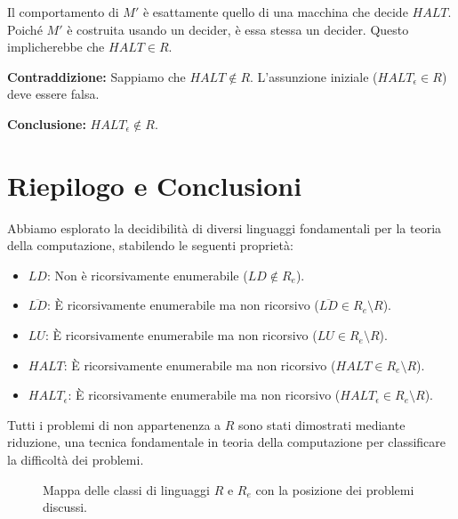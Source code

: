 \documentclass[a4paper]{article}
\makeatletter
\renewenvironment{proof}[1][\proofname]{\par
  \pushQED{\qed}%
  \normalfont \topsep6\p@\@plus6\p@\relax
  \trivlist
  \item[\hskip\labelsep
        \bfseries
    #1\@addpunct{.}]\ignorespaces
}{%
  \popQED\endtrivlist\@endpefalse
}
\makeatother
\begin{document}
\begin{proof}
Il comportamento di $M'$ è esattamente quello di una macchina che decide $HALT$. Poiché $M'$ è costruita usando un decider, è essa stessa un decider. Questo implicherebbe che $HALT \in R$.

\textbf{Contraddizione:} Sappiamo che $HALT \notin R$.
L'assunzione iniziale ($HALT_\epsilon \in R$) deve essere falsa.

\textbf{Conclusione:} $HALT_\epsilon \notin R$.
\end{proof}

\section{Riepilogo e Conclusioni}
Abbiamo esplorato la decidibilità di diversi linguaggi fondamentali per la teoria della computazione, stabilendo le seguenti proprietà:
\begin{itemize}
    \item $LD$: Non è ricorsivamente enumerabile ($LD \notin R_e$).
    \item $\overline{LD}$: È ricorsivamente enumerabile ma non ricorsivo ($\overline{LD} \in R_e \setminus R$).
    \item $LU$: È ricorsivamente enumerabile ma non ricorsivo ($LU \in R_e \setminus R$).
    \item $HALT$: È ricorsivamente enumerabile ma non ricorsivo ($HALT \in R_e \setminus R$).
    \item $HALT_\epsilon$: È ricorsivamente enumerabile ma non ricorsivo ($HALT_\epsilon \in R_e \setminus R$).
\end{itemize}
Tutti i problemi di non appartenenza a $R$ sono stati dimostrati mediante riduzione, una tecnica fondamentale in teoria della computazione per classificare la difficoltà dei problemi.

\begin{figure}[h!]
    \centering
    \caption{Mappa delle classi di linguaggi $R$ e $R_e$ con la posizione dei problemi discussi.}
    \label{fig:r_re_map_updated}
\end{figure}
\end{document}

